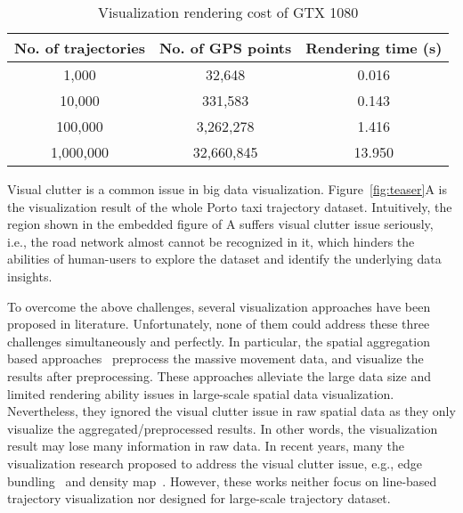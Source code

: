\begin{table}
	\centering
    \small
	\caption{Visualization rendering cost of GTX 1080}
	\begin{tabular}{|c|c|c|} \hline
		No. of trajectories & No. of GPS points & Rendering time (s) \\ \hline
		1,000& 32,648 & 0.016\\ \hline
		10,000& 331,583 & 0.143\\ \hline
		100,000& 3,262,278 & 1.416\\ \hline
		1,000,000& 32,660,845 & 13.950\\
		\hline
	\end{tabular}
	\label{tab:gpu}
\end{table}

Visual clutter is a common issue in big data visualization.
Figure~\ref{fig:teaser}A is the visualization result of the whole Porto taxi trajectory dataset.
Intuitively, the region shown in the embedded figure of A suffers visual clutter issue seriously,
i.e., the road network almost cannot be recognized in it,
which hinders the abilities of human-users to explore the dataset and identify the underlying data insights.



To overcome the above challenges, several visualization approaches have been proposed in literature.
Unfortunately, none of them could address these three challenges simultaneously and perfectly.
In particular, the spatial aggregation based approaches~\cite{zeng2013visualizing,von2015mobilitygraphs} preprocess the massive movement data, and visualize the results after preprocessing.
These approaches alleviate the large data size and limited rendering ability issues in large-scale spatial data visualization.
Nevertheless, they ignored the visual clutter issue in raw spatial data as they only visualize the aggregated/preprocessed results.
In other words, the visualization result may lose many information in raw data.
In recent years, many the visualization research proposed to address the visual clutter issue,
e.g., edge bundling~\cite{zeng2019route, thony2015vector} and density map~\cite{lampe2011interactive, scheepens2011interactive}.
However, these works neither focus on line-based trajectory visualization nor designed for large-scale trajectory dataset.

